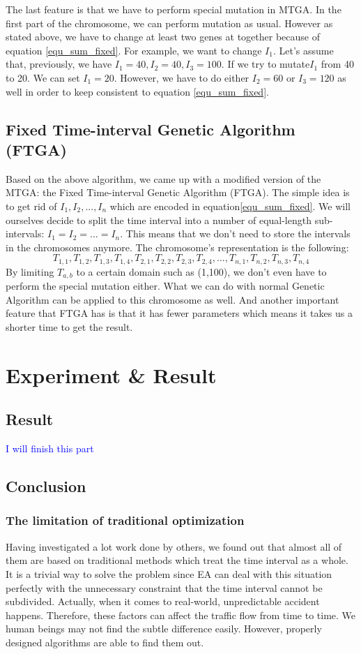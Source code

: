 \documentclass{article} %
\begin{document}
The last feature is that we have to perform special mutation in MTGA. In the first part of the chromosome, we can perform mutation as usual. However as stated above, we have to change at least two genes at together because of equation \ref{equ_sum_fixed}. For example, we want to change ${I_1}$. Let's assume that, previously, we have $I_1 = 40, I_2 = 40, I_3 = 100$. If we try to mutate$I_1$ from 40 to 20. We can set $I_1 = 20$. However, we have to do either $I_2=60$ or $I_3=120$ as well in order to keep consistent to equation \ref{equ_sum_fixed}. 


\subsection{Fixed Time-interval Genetic Algorithm (FTGA)}
Based on the above algorithm, we came up with a modified version of the MTGA: the Fixed Time-interval Genetic Algorithm (FTGA). The simple idea is to get rid of $I_1, I_2, ..., I_n$ which are encoded in equation\ref{equ_sum_fixed}. We will ourselves decide to split the time interval into a number of equal-length sub-intervals: $I_1=I_2=...=I_n$. This means that we don't need to store the intervals in the chromosomes anymore. The chromosome's representation is the following:
\begin{equation}
T_{1,1}, T_{1,2}, T_{1,3}, T_{1,4},T_{2,1}, T_{2,2}, T_{2,3}, T_{2,4},...,T_{n,1}, T_{n, 2},T_{n,3}, T_{n, 4}
\end{equation}
By limiting $T_{a,b}$ to a certain domain such as (1,100), we don't even have to perform the special mutation either. What we can do with normal Genetic Algorithm can be applied to this chromosome as well. And another important feature that FTGA has is that it has fewer parameters which means it takes us a shorter time to get the result. 


\section{Experiment \& Result}
\subsection{Result}
\textcolor{blue}{I will finish this part}
\subsection{Conclusion}
\subsubsection{The limitation of traditional optimization}
Having investigated a lot work done by others, we found out that almost all of them are based on traditional methods which treat the time interval as a whole. It is a trivial way to solve the problem since EA can deal with this situation perfectly with the unnecessary constraint that the time interval cannot be subdivided. Actually, when it comes to real-world, unpredictable accident happens. Therefore, these factors can affect the traffic flow from time to time. We human beings may not find the subtle difference easily. However, properly designed algorithms are able to find them out.
\end{document}
